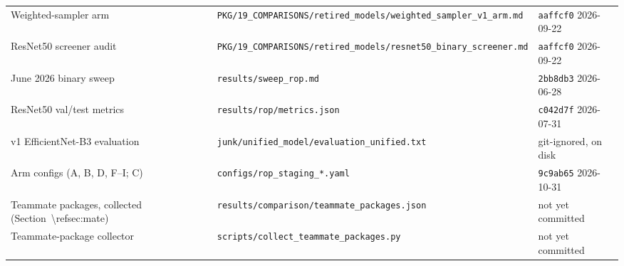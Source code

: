 \begin{tabular}{@{}>{\raggedright\arraybackslash}p{4.6cm}>{\raggedright\arraybackslash}p{9.6cm}l@{}}
Weighted-sampler arm & \texttt{PKG/\allowbreak{}19\_COMPARISONS/\allowbreak{}retired\_models/\allowbreak{}weighted\_sampler\_v1\_arm.md} & \texttt{aaffcf0} 2026-09-22 \\
ResNet50 screener audit & \texttt{PKG/\allowbreak{}19\_COMPARISONS/\allowbreak{}retired\_models/\allowbreak{}resnet50\_binary\_screener.md} & \texttt{aaffcf0} 2026-09-22 \\
June 2026 binary sweep & \texttt{results/\allowbreak{}sweep\_rop.md} & \texttt{2bb8db3} 2026-06-28 \\
ResNet50 val/test metrics & \texttt{results/\allowbreak{}rop/\allowbreak{}metrics.json} & \texttt{c042d7f} 2026-07-31 \\
v1 EfficientNet-B3 evaluation & \texttt{junk/\allowbreak{}unified\_model/\allowbreak{}evaluation\_unified.txt} & git-ignored, on disk \\
Arm configs (A, B, D, F--I; C) & \texttt{configs/\allowbreak{}rop\_staging\_*.yaml} & \texttt{9c9ab65} 2026-10-31 \\
Teammate packages, collected (Section~\textbackslash{}ref{sec:mate}) & \texttt{results/\allowbreak{}comparison/\allowbreak{}teammate\_packages.json} & not yet committed \\
Teammate-package collector & \texttt{scripts/\allowbreak{}collect\_teammate\_packages.py} & not yet committed \\
\bottomrule
\end{tabular}

